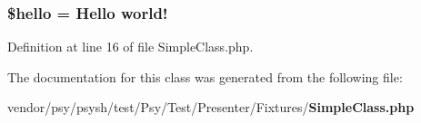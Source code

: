 \subsubsection[{\$hello}]{\setlength{\rightskip}{0pt plus 5cm}\$hello = \textquotesingle{}Hello world!\textquotesingle{}}\label{class_psy_1_1_test_1_1_presenter_1_1_fixtures_1_1_simple_class_a680ca29c367f955ac2569ca96d621113}


Definition at line 16 of file Simple\+Class.\+php.



The documentation for this class was generated from the following file\+:\begin{DoxyCompactItemize}
\item 
vendor/psy/psysh/test/\+Psy/\+Test/\+Presenter/\+Fixtures/{\bf Simple\+Class.\+php}\end{DoxyCompactItemize}
